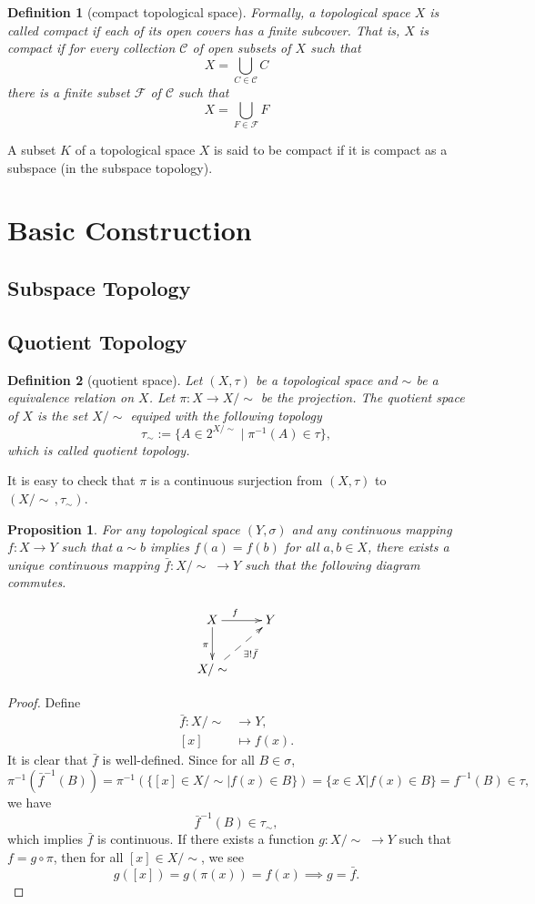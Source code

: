 \documentclass{report}
\newtheorem{definition}{Definition}[section]
\newtheorem{proposition}{Proposition}[section]
\theoremstyle{nonumberplain}
\newtheorem{proof}{Proof.}
\begin{document}
\begin{definition}[compact topological space]
	Formally, a topological space $X$ is called \emph{compact} if each of its open covers has a finite subcover. That is, $X$ is compact if for every collection $\mathcal{C}$ of open subsets of $X$ such that
	\[
	X=\bigcup_{C \in \mathcal{C}} C
	\]
	there is a finite subset $\mathcal{F}$ of $\mathcal{C}$ such that
	\[
	X=\bigcup_{F \in \mathcal{F}} F
	\]
\end{definition}
A subset $K$ of a topological space $X$ is said to be compact if it is compact as a subspace (in the subspace topology).
\section{Basic Construction}
\subsection{Subspace Topology}

\subsection{Quotient Topology}
\begin{definition}[quotient space]
	Let $(X,\tau)$ be a topological space and $\sim$ be a equivalence relation on $X$. Let $\pi:X\to X/\sim$ be the projection. 
	The \emph{quotient space} of $X$ is the set $X/\sim$ equiped with the following topology
	\[
	\tau_\sim:=\{A\in 2^{X/\sim}\mid \pi^{-1}(A)\in \tau\},
	\]
	which is called \emph{quotient topology}.
\end{definition}

It is easy to check that $\pi$ is a continuous surjection from $(X,\tau)$ to $(X/\sim\,,\tau_\sim)$.

\begin{proposition}
	 For any topological space $(Y,\sigma)$ and any continuous mapping $f:X\to Y$ such that $a\sim b$ implies $f(a) = f(b)$ for all $a,b \in X$, there exists a unique continuous mapping $\bar{f}:X/\sim\;\to Y$ such that the following diagram commutes.
	
	\[\xymatrix{
		X\ar[r]^{f\quad}\ar[d]_{\pi}  &Y\\
		X/\sim\ar@{-->}[ru]_{\exists!\bar{f}}&  
	}\]
\end{proposition}


\begin{proof}
	Define
	\begin{align*}
		\bar{f}:X/\sim&\longrightarrow Y,\\
		[x]&\longmapsto f(x).
	\end{align*}
	It is clear that $\bar{f}$ is well-defined. Since for all $B\in \sigma$,
	\[
	\pi^{-1}\left(\bar{f}^{-1}(B)\right)=\pi^{-1}\left(\{[x]\in X/\sim| f(x)\in B\}\right)=\{x\in X| f(x)\in B\}=f^{-1}(B)\in \tau,
	\]
	we have
	\[
	\bar{f}^{-1}(B)\in \tau_\sim,
	\]
	which implies $\bar{f}$ is continuous. If there exists a function $g:X/\sim\;\to Y$ such that $f=g\circ\pi$, then for all $[x]\in X/\sim$, we see
	\[
	g([x])=g(\pi(x))=f(x)\implies g=\bar{f}.
	\]
\end{proof}
\end{document}
